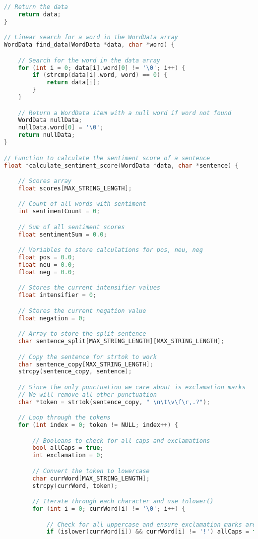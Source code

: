 \documentclass[12pt]{article}
\begin{document}
\begin{lstlisting}[basicstyle=\tiny, language=c]
	// Return the data
	return data;
}

// Linear search for a word in the WordData array
WordData find_data(WordData *data, char *word) {

	// Search for the word in the data array
	for (int i = 0; data[i].word[0] != '\0'; i++) {
		if (strcmp(data[i].word, word) == 0) {
			return data[i];
		}
	}

	// Return a WordData item with a null word if word not found
	WordData nullData;
	nullData.word[0] = '\0';
	return nullData;
}

// Function to calculate the sentiment score of a sentence
float *calculate_sentiment_score(WordData *data, char *sentence) {

	// Scores array
	float scores[MAX_STRING_LENGTH];

	// Count of all words with sentiment
	int sentimentCount = 0;

	// Sum of all sentiment scores
	float sentimentSum = 0.0;

	// Variables to store calculations for pos, neu, neg
	float pos = 0.0;
	float neu = 0.0;
	float neg = 0.0;

	// Stores the current intensifier values
	float intensifier = 0;

	// Stores the current negation value
	float negation = 0;

	// Array to store the split sentence
	char sentence_split[MAX_STRING_LENGTH][MAX_STRING_LENGTH];

	// Copy the sentence for strtok to work
	char sentence_copy[MAX_STRING_LENGTH];
	strcpy(sentence_copy, sentence);

	// Since the only punctuation we care about is exclamation marks
	// We will remove all other punctuation
	char *token = strtok(sentence_copy, " \n\t\v\f\r,.?");

	// Loop through the tokens
	for (int index = 0; token != NULL; index++) {

		// Booleans to check for all caps and exclamations
		bool allCaps = true;
		int exclamation = 0;

		// Convert the token to lowercase
		char currWord[MAX_STRING_LENGTH];
		strcpy(currWord, token);

		// Iterate through each character and use tolower()
		for (int i = 0; currWord[i] != '\0'; i++) {

			// Check for all uppercase and ensure exclamation marks are not counted
			if (islower(currWord[i]) && currWord[i] != '!') allCaps = false;


\end{lstlisting}
\end{document}
